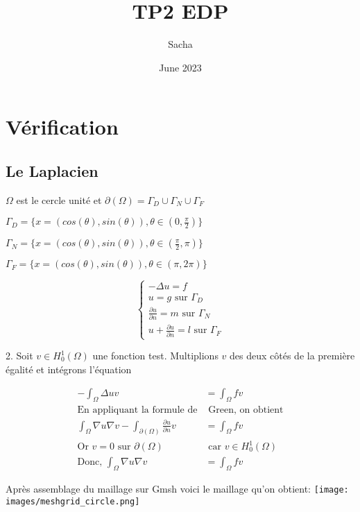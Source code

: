 \documentclass{article}
\title{TP2 EDP}
\author{Sacha}
\date{June 2023}
\begin{document}
\maketitle

\section{Vérification}

\subsection{Le Laplacien}

$\Omega$ est le cercle unité et $\partial(\Omega) = \Gamma_D \cup \Gamma_N \cup \Gamma_F$

$\Gamma_D = \{ x = (cos(\theta),sin(\theta)), \theta \in (0,\frac{\pi}{2}) \}$

$\Gamma_N = \{ x = (cos(\theta),sin(\theta)), \theta \in (\frac{\pi}{2},\pi) \}$

$\Gamma_F = \{ x = (cos(\theta),sin(\theta)), \theta \in (\pi,2 \pi) \}$



$$\begin{cases}
    -\Delta u = f \\
    u = g \text{ sur } \Gamma_D\\
    \frac{\partial u}{\partial n} = m \text{ sur } \Gamma_N\\
    u + \frac{\partial u}{\partial n} = l \text{ sur } \Gamma_F
\end{cases}$$

2. Soit $v \in H^1_0(\Omega)$ une fonction test. Multiplions $v$ des deux côtés de la première égalité et intégrons l'équation

\begin{align*}
    -\int_{\Omega} \Delta u v &= \int_{\Omega} f v \\
    \text{En appliquant la formule de} &\text{ Green, on obtient} \\
    \int_{\Omega}  \nabla u \nabla v - \int_{\partial(\Omega)} \frac{\partial u}{\partial n} v &= \int_{\Omega} f v \\
    \text{Or $v = 0$ sur $\partial(\Omega)$} &\text{ car $v \in H_0^1(\Omega)$} \\
    \text{Donc, } \int_{\Omega} \nabla u \nabla v &= \int_{\Omega} fv
\end{align*}

Après assemblage du maillage sur Gmsh voici le maillage qu'on obtient:
\texttt{[image: images/meshgrid\_circle.png]}
\end{document}
